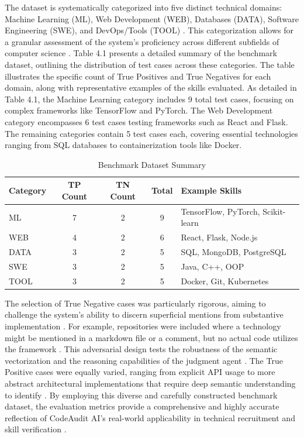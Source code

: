 The dataset is systematically categorized into five distinct technical domains: Machine Learning (ML), Web Development (WEB), Databases (DATA), Software Engineering (SWE), and DevOps/Tools (TOOL) \cite{ref8, ref41}. This categorization allows for a granular assessment of the system's proficiency across different subfields of computer science \cite{ref13}. Table 4.1 presents a detailed summary of the benchmark dataset, outlining the distribution of test cases across these categories. The table illustrates the specific count of True Positives and True Negatives for each domain, along with representative examples of the skills evaluated. As detailed in Table 4.1, the Machine Learning category includes 9 total test cases, focusing on complex frameworks like TensorFlow and PyTorch. The Web Development category encompasses 6 test cases testing frameworks such as React and Flask. The remaining categories contain 5 test cases each, covering essential technologies ranging from SQL databases to containerization tools like Docker.

\begin{table}[htbp]
\setlength{\tabcolsep}{12pt}
\renewcommand{\arraystretch}{1.2}
\setlength{\tabcolsep}{10pt}
\centering
\small
\caption{Benchmark Dataset Summary}
\label{tab:benchmark_summary}
\begin{tabularx}{\textwidth}{lcccX}
\toprule
\textbf{Category} & \textbf{TP Count} & \textbf{TN Count} & \textbf{Total} & \textbf{Example Skills} \\ \midrule
ML & 7 & 2 & 9 & TensorFlow, PyTorch, Scikit-learn \\
WEB & 4 & 2 & 6 & React, Flask, Node.js \\
DATA & 3 & 2 & 5 & SQL, MongoDB, PostgreSQL \\
SWE & 3 & 2 & 5 & Java, C++, OOP \\
TOOL & 3 & 2 & 5 & Docker, Git, Kubernetes \\ \bottomrule
\end{tabularx}
\end{table}

The selection of True Negative cases was particularly rigorous, aiming to challenge the system's ability to discern superficial mentions from substantive implementation \cite{ref4, ref51}. For example, repositories were included where a technology might be mentioned in a markdown file or a comment, but no actual code utilizes the framework \cite{ref23}. This adversarial design tests the robustness of the semantic vectorization and the reasoning capabilities of the judgment agent \cite{ref15}. The True Positive cases were equally varied, ranging from explicit API usage to more abstract architectural implementations that require deep semantic understanding to identify \cite{ref39}. By employing this diverse and carefully constructed benchmark dataset, the evaluation metrics provide a comprehensive and highly accurate reflection of CodeAudit AI's real-world applicability in technical recruitment and skill verification \cite{ref38}. 


